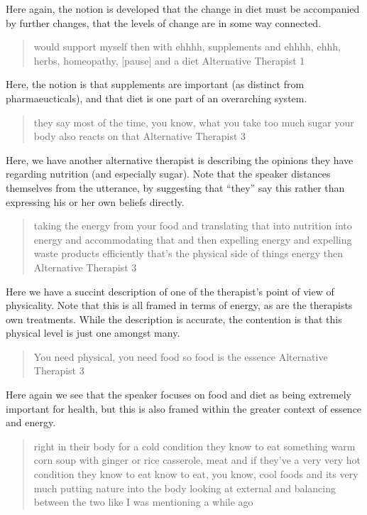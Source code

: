 Here again, the notion is developed that the change in diet must be accompanied by further changes, that the levels of change are in some way connected. 

\begin{quotation}
  would support myself then with ehhhh, supplements and ehhhh, ehhh, herbs, homeopathy, [pause] and a diet
Alternative Therapist 1
\end{quotation}

Here, the notion is that supplements are important (as distinct from pharmaeucticals), and that diet is one part of an overarching system. 

\begin{quotation}
  
 they say most of the time, you know, what you take too much sugar your body also reacts on that 
Alternative Therapist 3
\end{quotation}

Here, we have another alternative therapist is describing the opinions they have regarding nutrition (and especially sugar). Note that the speaker distances themselves from the utterance, by suggesting that ``they'' say this rather than expressing his or her own beliefs directly. 

\begin{quotation}
  taking the energy from your food and translating that into nutrition into energy and accommodating that and then expelling energy and expelling waste products efficiently that's the physical side of things energy then
Alternative Therapist 3
\end{quotation}

Here we have a succint description of one of the therapist's point of view of physicality. Note that this is all framed in terms of energy, as are the therapists own treatments. While the description is accurate, the contention is that this physical level is just one amongst many. 

\begin{quotation}
  You need physical, you need food so food is the essence
Alternative Therapist 3
\end{quotation}

Here again we see that the speaker focuses on food and diet as being extremely important for health, but this is also framed within the greater context of essence and energy. 

\begin{quotation}
 right in their body for a cold condition they know to eat something warm corn soup with ginger or rice casserole, meat and if they've a very very hot condition they know to eat know to eat, you know, cool foods and its very much putting nature into the body looking at external and balancing between the two like I was mentioning a while ago


\end{quotation}

